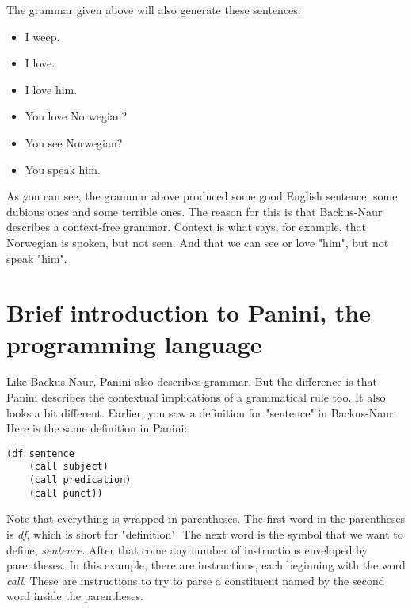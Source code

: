 \documentclass{article}
\begin{document}
The grammar given above will also generate these sentences:
\begin{itemize}
	\item I weep.
	\item I love.
	\item I love him.
	\item You love Norwegian?
	\item You see Norwegian?
	\item You speak him.
\end{itemize}

As you can see, the grammar above produced some good English sentence, some dubious ones and some terrible ones. The reason for this
is that Backus-Naur describes a context-free grammar. Context is what says, for example, that Norwegian is spoken, but not seen. And
that we can see or love "him", but not speak "him".

\section{Brief introduction to Panini, the programming language}
Like Backus-Naur, Panini also describes grammar. But the difference is that Panini describes the contextual implications of a 
grammatical rule too. It also looks a bit different. Earlier, you saw a definition for "sentence" in Backus-Naur. Here is the same 
definition in Panini:
\begin{lstlisting}
(df sentence
	(call subject)
	(call predication)
	(call punct))
\end{lstlisting}
Note that everything is wrapped in parentheses. The first word in the parentheses is \emph{df}, which is short for "definition". The
next word is the symbol that we want to define, \emph{sentence}. After that come any number of instructions enveloped by 
parentheses. In this example, there are instructions, each beginning with the word \emph{call}. These are instructions to try to 
parse a constituent named by the second word inside the parentheses. 
\end{document}
